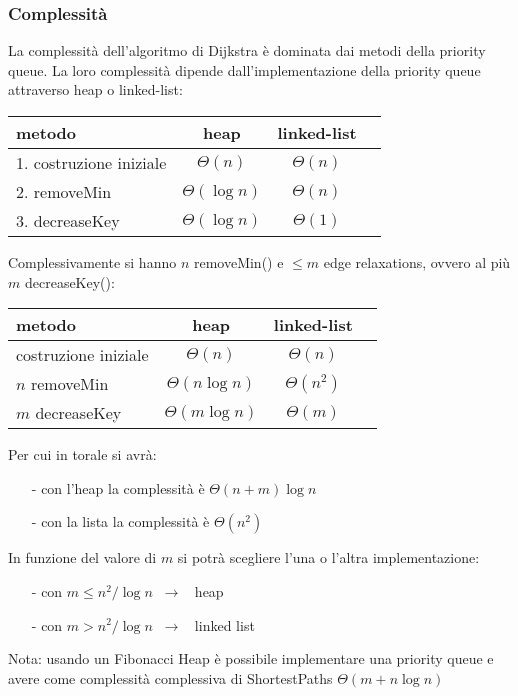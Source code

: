 \documentclass[a4paper]{article}
\begin{document}
\subsubsection*{Complessità}
La complessità dell'algoritmo di Dijkstra è dominata dai metodi della priority queue. La loro complessità dipende dall'implementazione
della priority queue attraverso heap o linked-list:
\begin{center}
	\begin{tabular}{l | c | c | c}
		\textbf{metodo} & \textbf{heap} & \textbf{linked-list} \\
		\toprule
		1. costruzione iniziale & \(\Theta(n)\) & \(\Theta(n)\) \\
		\midrule
		2. removeMin & \(\Theta(\log n)\) & \(\Theta(n)\) \\
		\midrule
		3. decreaseKey & \(\Theta(\log n)\) & \(\Theta(1)\) \\
		\bottomrule
	\end{tabular}
\end{center}
Complessivamente si hanno \(n\) removeMin() e \(\leq m\) edge relaxations, ovvero al più \(m\) decreaseKey():
\begin{center}
	\begin{tabular}{l | c | c | c}
		\textbf{metodo} & \textbf{heap} & \textbf{linked-list} \\
		\toprule
		costruzione iniziale & \(\Theta(n)\) & \(\Theta(n)\) \\
		\midrule
		\(n\) removeMin & \(\Theta(n \log n)\) & \(\Theta(n^2)\) \\
		\midrule
		\(m\) decreaseKey & \(\Theta(m \log n)\) & \(\Theta(m)\) \\
		\bottomrule
	\end{tabular}
\end{center}
Per cui in torale si avrà:
\begin{itemize}[topsep=3pt, itemsep=0pt]
	\item[-] con l'heap la complessità è \(\Theta(n+m) \log n\)
	\item[-] con la lista la complessità è \(\Theta(n^2)\)
\end{itemize}
In funzione del valore di \(m\) si potrà scegliere l'una o l'altra implementazione:
\begin{itemize}[topsep=3pt, itemsep=0pt]
	\item[-] con \(m \leq n^2 / \log n \;\; \rightarrow \;\;\) heap
	\item[-] con \(m > n^2 / \log n \;\; \rightarrow \;\;\) linked list
\end{itemize}
Nota: usando un Fibonacci Heap è possibile implementare una priority queue e avere come complessità complessiva di ShortestPaths
\(\Theta(m + n \log n)\)
\end{document}
